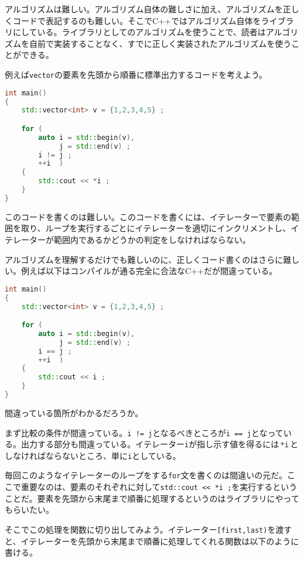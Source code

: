 
アルゴリズムは難しい。アルゴリズム自体の難しさに加え、アルゴリズムを正しくコードで表記するのも難しい。そこでC++ではアルゴリズム自体をライブラリにしている。ライブラリとしてのアルゴリズムを使うことで、読者はアルゴリズムを自前で実装することなく、すでに正しく実装されたアルゴリズムを使うことができる。


例えば\texttt{vector}の要素を先頭から順番に標準出力するコードを考えよう。

\begin{lstlisting}[language={C++}]
int main()
{
    std::vector<int> v = {1,2,3,4,5} ;

    for (
        auto i = std::begin(v),
             j = std::end(v) ;
        i != j ;
        ++i  )
    {
        std::cout << *i ;
    }
}
\end{lstlisting}

このコードを書くのは難しい。このコードを書くには、イテレーターで要素の範囲を取り、ループを実行するごとにイテレーターを適切にインクリメントし、イテレーターが範囲内であるかどうかの判定をしなければならない。

アルゴリズムを理解するだけでも難しいのに、正しくコード書くのはさらに難しい。例えば以下はコンパイルが通る完全に合法なC++だが間違っている。

\begin{lstlisting}[language={C++}]
int main()
{
    std::vector<int> v = {1,2,3,4,5} ;

    for (
        auto i = std::begin(v),
             j = std::end(v) ;
        i == j ;
        ++i  )
    {
        std::cout << i ;
    }
}
\end{lstlisting}

間違っている箇所がわかるだろうか。

まず比較の条件が間違っている。\texttt{i != j}となるべきところが\texttt{i == j}となっている。出力する部分も間違っている。イテレーター\texttt{i}が指し示す値を得るには\,\texttt{*i}\,としなければならないところ、単に\texttt{i}としている。

毎回このようなイテレーターのループをする\texttt{for}文を書くのは間違いの元だ。ここで重要なのは、要素のそれぞれに対して\texttt{std::cout {<}{<} *i ;}を実行するということだ。要素を先頭から末尾まで順番に処理するというのはライブラリにやってもらいたい。

そこでこの処理を関数に切り出してみよう。イテレーター\texttt{[first,last)}を渡すと、イテレーターを先頭から末尾まで順番に処理してくれる関数は以下のように書ける。

